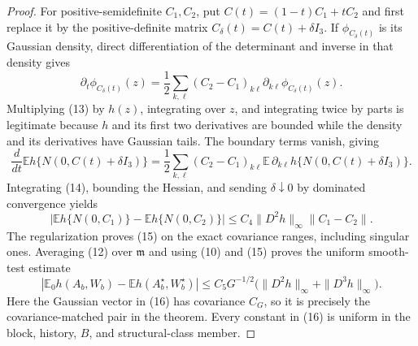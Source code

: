 \documentclass{article}
\begin{document}
\begin{proof}
For positive-semidefinite \(C_1,C_2\), put
\(
 C(t)=(1-t)C_1+tC_2
\)
and first replace it by the positive-definite matrix \(C_\delta(t)=C(t)+\delta I_3\).  If \(\phi_{C_\delta(t)}\) is its Gaussian density, direct differentiation of the determinant and inverse in that density gives
\[
 \partial_t\phi_{C_\delta(t)}(z)
 =\frac12\sum_{k,\ell}(C_2-C_1)_{k\ell}
       \partial_{k\ell}\phi_{C_\delta(t)}(z).                            \tag{13}
\]
Multiplying (13) by \(h(z)\), integrating over \(z\), and integrating twice by parts is legitimate because \(h\) and its first two derivatives are bounded while the density and its derivatives have Gaussian tails.  The boundary terms vanish, giving
\[
 \frac d{dt}\mathbb Eh\{N(0,C(t)+\delta I_3)\}
 =\frac12\sum_{k,\ell}(C_2-C_1)_{k\ell}
   \mathbb E\,\partial_{k\ell}h\{N(0,C(t)+\delta I_3)\}.               \tag{14}
\]
Integrating (14), bounding the Hessian, and sending \(\delta\downarrow0\) by dominated convergence yields
\[
 |\mathbb Eh\{N(0,C_1)\}-\mathbb Eh\{N(0,C_2)\}|
 \leq C_4\|D^2h\|_\infty\|C_1-C_2\|.                                 \tag{15}
\]
The regularization proves (15) on the exact covariance ranges, including singular ones.  Averaging (12) over \(\mathfrak m\) and using (10) and (15) proves the uniform smooth-test estimate
\[
 \left|\mathbb E_0h(A_b,W_b)-\mathbb Eh(A_b^\star,W_b^\star)\right|
 \leq C_5G^{-1/2}
       \bigl(\|D^2h\|_\infty+\|D^3h\|_\infty\bigr).                   \tag{16}
\]
Here the Gaussian vector in (16) has covariance \(C_G\), so it is precisely the covariance-matched pair in the theorem.  Every constant in (16) is uniform in the block, history, \(B\), and structural-class member.


\end{proof}
\end{document}
